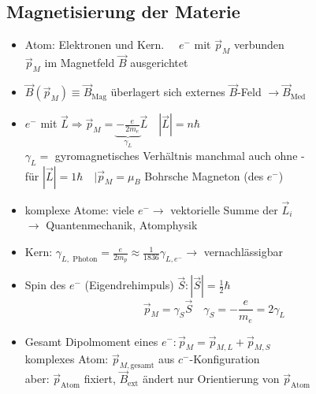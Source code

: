 \documentclass[titlepage,12pt,a4paper,ngerman]{report}
\newcommand{\tx}[1]{\textrm{#1}}
\newcommand{\ub}[1]{\underbrace{#1}}
\begin{document}
\subsection{Magnetisierung der Materie}
\begin{itemize}
	\item Atom: Elektronen und Kern. $ \quad e^- $ mit $ \vec{p}_M $ verbunden\\
	$ \vec{p}_M $ im Magnetfeld $ \vec{B} $ ausgerichtet
	\item $ \vec{B} (\vec{p}_M) \equiv \vec{B}_{\tx{Mag}} $ überlagert sich externes $ \vec{B} $-Feld $ \rightarrow \vec{B}_{\tx{Med}} $
	\item $ e^- $ mit $ \vec{L} \Rightarrow \vec{p}_M = \ub{-\frac{e}{2 m_e}}_{\gamma _L} \vec{L} \quad |\vec{L}| = n \hbar $\\
	$ \gamma _L = $ gyromagnetisches Verhältnis manchmal auch ohne -\\
	für $ |\vec{L}| = 1 \hbar  \quad |\vec{p}_M = \mu_B $ Bohrsche Magneton (des $ e^- $)
	\item komplexe Atome: viele $ e^- \rightarrow $ vektorielle Summe der $ \vec{L}_i $\\
	$ \rightarrow $ Quantenmechanik, Atomphysik
	\item Kern: $ \gamma_{L,\tx{ Photon}} = \frac{e}{2 m_p} \approx \frac{1}{1836} \gamma_{L,e^-} \rightarrow $ vernachlässigbar
	\item Spin des $ e^- $ (Eigendrehimpuls) $ \vec{S}: | \vec{S}| = \frac{1}{2} \hbar $\\
	$$ \vec{p}_M = \gamma_S \vec{S} \quad \gamma_S = - \frac{e}{m_e} = 2 \gamma_L $$
	\item Gesamt Dipolmoment eines $ e^-: \vec{p}_M = \vec{p}_{M,L} + \vec{p}_{M,S} $\\
	komplexes Atom: $ \vec{p}_{M, \tx{gesamt}} $ aus $ c^- $-Konfiguration\\
	aber: $ \vec{p}_{\tx{Atom}} $ fixiert, $ \vec{B}_{\tx{ext}} $ ändert nur Orientierung von $ \vec{p}_{\tx{Atom}} $
\end{itemize}
\end{document}
